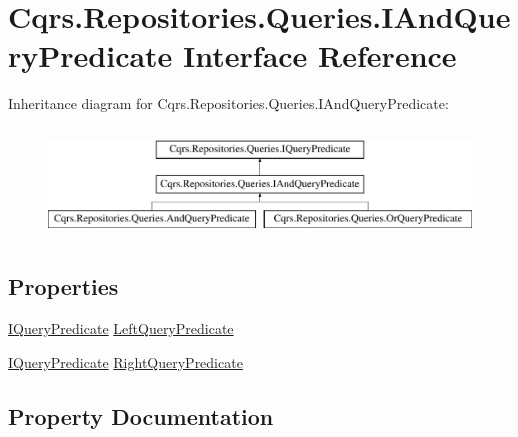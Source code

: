 \hypertarget{interfaceCqrs_1_1Repositories_1_1Queries_1_1IAndQueryPredicate}{}\section{Cqrs.\+Repositories.\+Queries.\+I\+And\+Query\+Predicate Interface Reference}
\label{interfaceCqrs_1_1Repositories_1_1Queries_1_1IAndQueryPredicate}
Inheritance diagram for Cqrs.\+Repositories.\+Queries.\+I\+And\+Query\+Predicate\+:\begin{figure}[H]
\begin{center}
\leavevmode
\includegraphics[height=2.916667cm]{interfaceCqrs_1_1Repositories_1_1Queries_1_1IAndQueryPredicate}
\end{center}
\end{figure}
\subsection*{Properties}
\begin{DoxyCompactItemize}
\item 
\hyperlink{interfaceCqrs_1_1Repositories_1_1Queries_1_1IQueryPredicate}{I\+Query\+Predicate} \hyperlink{interfaceCqrs_1_1Repositories_1_1Queries_1_1IAndQueryPredicate_a35166ddeebe86048dba2e7f03407aa94_a35166ddeebe86048dba2e7f03407aa94}{Left\+Query\+Predicate}
\item 
\hyperlink{interfaceCqrs_1_1Repositories_1_1Queries_1_1IQueryPredicate}{I\+Query\+Predicate} \hyperlink{interfaceCqrs_1_1Repositories_1_1Queries_1_1IAndQueryPredicate_ab24faa4c3423f91a8d9115b2cae6684b_ab24faa4c3423f91a8d9115b2cae6684b}{Right\+Query\+Predicate}
\end{DoxyCompactItemize}


\subsection{Property Documentation}
\mbox{\label{interfaceCqrs_1_1Repositories_1_1Queries_1_1IAndQueryPredicate_a35166ddeebe86048dba2e7f03407aa94_a35166ddeebe86048dba2e7f03407aa94}} 
